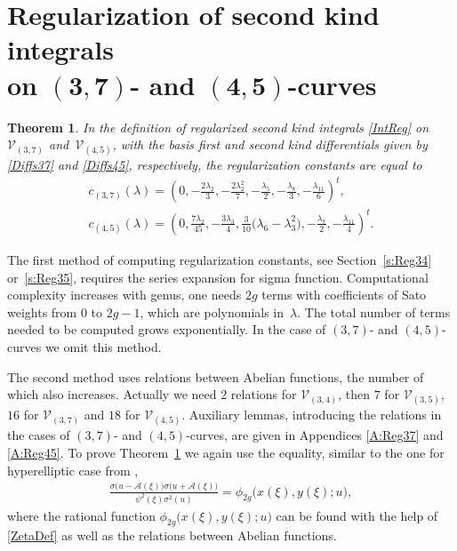 \documentclass[pdftex]{sigma}
\numberwithin{equation}{section}
\newtheorem{Theorem}{Theorem}[section]
\begin{document}
\section[Regularization of second kind integrals on $(3,7)$- and $(4,5)$-curves]{Regularization of second kind integrals\\ on $\boldsymbol{(3,7)}$- and $\boldsymbol{(4,5)}$-curves}\label{s:Reg37}

\begin{Theorem}\label{T:RegCg6} In the definition of regularized second kind integrals \eqref{IntReg} on $\mathcal{V}_{(3,7)}$ and~$\mathcal{V}_{(4,5)}$, {with the basis first and second kind differentials given by \eqref{Diffs37} and \eqref{Diffs45}, respectively, the regularization constants are equal to}
 \begin{gather*}
 c_{(3,7)}(\lambda) = \left(0,-\frac{2\lambda_2}{3},-\frac{2\lambda_2^2}{7},-\frac{\lambda_5}{2},
 -\frac{\lambda_8}{3},-\frac{\lambda_{11}}{6}\right)^t, \\ %
 c_{(4,5)}(\lambda) = \left(0, \frac{7\lambda_2}{45}, -\frac{3\lambda_3}{4},\frac{3}{10}\big(\lambda_6-\lambda_3^2\big), -\frac{\lambda_7}{2}, -\frac{\lambda_{11}}{4} \right)^t. %
\end{gather*}
\end{Theorem}

The first method of computing regularization constants, see Section~\ref{s:Reg34} or~\ref{s:Reg35}, requires the series expansion for sigma function. Computational complexity increases with genus, one needs $2g$ terms with coefficients of Sato weights from $0$ to $2g-1$, which are polynomials in~$\lambda$. The total number of terms needed to be computed grows exponentially. In the case of $(3,7)$- and $(4,5)$-curves we omit this method.

The second method uses relations between Abelian functions, the number of which also increases. Actually we need $2$ relations for $\mathcal{V}_{(3,4)}$, then $7$ for $\mathcal{V}_{(3,5)}$, $16$ for $\mathcal{V}_{(3,7)}$ and $18$ for $\mathcal{V}_{(4,5)}$. Auxiliary lemmas, introducing the relations in the cases of $(3,7)$- and $(4,5)$-curves, are given in Appendices \ref{A:Reg37} and \ref{A:Reg45}. To prove Theorem~\ref{T:RegCg6} we again use the equality, similar to the one for hyperelliptic case from \cite{BL2005},
\begin{gather*}
 \frac{\sigma\big(u-\mathcal{A}(\xi)\big)\sigma\big(u+\mathcal{A}(\xi)\big)} {\psi^2(\xi)\sigma^2(u)} = \phi_{2g}\big(x(\xi),y(\xi);u\big),
\end{gather*}
where the rational function $\phi_{2g}\big(x(\xi),y(\xi);u\big)$ can be found with the help of \eqref{ZetaDef} as well as the relations between Abelian functions.
\end{document}
